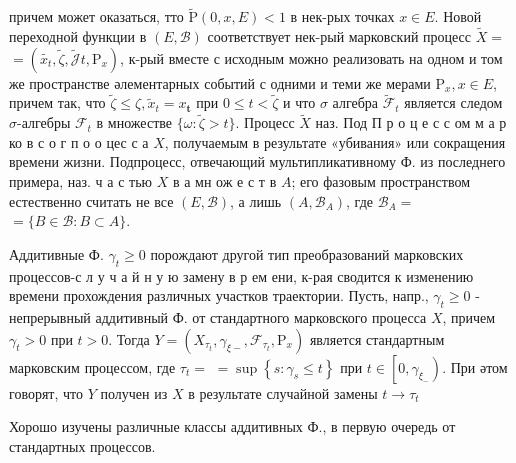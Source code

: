 \documentclass[10pt]{article}
\begin{document}
причем может оказаться, тто $\tilde{\mathrm{P}}(0, x, E)<1$ в нек-рых точках $x \in E$. Новой переходной функции в $(E, \mathscr{B})$ соответствует нек-рый марковский процесс $\tilde{X}=$ $=\left(\tilde{x_{t}}, \tilde{\zeta}, \tilde{\mathscr{J}} t, \mathrm{P}_{x}\right)$, к-рый вместе с исходным можно реализовать на одном и том же пространстве әлементарных событий с одними и теми же мерами $\mathrm{P}_{x}, x \in E$, причем так, что $\tilde{\zeta} \leqslant \zeta, \tilde{x}_{t}=x_{\boldsymbol{t}}$ при $0 \leqslant t<\tilde{\zeta}$ и что $\sigma$ алгебра $\tilde{\mathscr{F}}_{t}$ является следом $\sigma$-алгебры $\mathscr{F}_{t}$ в множестве $\{\omega: \tilde{\zeta}>t\}$. Процесс $\tilde{X}$ наз. Под П р о ц е с с ом м а р ко в с о г п о о цес с а $X$, получаемым в результате «убивания» или сокращения времени жизни. Подпроцесс, отвечающий мультипликативному Ф. из последнего примера, наз. ч а с тью $X$ в а мн ож е с т в $A$; его фазовым пространством естественно считать не все $(E, \mathscr{B})$, а лишь $\left(A, \mathscr{B}_{A}\right)$, где $\mathscr{B}_{A}=$ $=\{B \in \mathscr{B}: B \subset A\}$.



Аддитивные Ф. $\gamma_{t} \geqslant 0$ порождают другой тип преобразований марковских процессов-с л у ч а й н у ю замену в р ем ени, к-рая сводится к изменению времени прохождения различных участков траектории. Пусть, напр., $\gamma_{t} \geqslant 0$ - непрерывный аддитивный Ф. от стандартного марковского процесса $X$, причем $\gamma_{t}>0$ при $t>0$. Тогда $Y=\left(X_{\tau_{t}}, \gamma_{\xi-}, \mathscr{F}_{\tau_{t}}, \mathrm{P}_{x}\right)$ является стандартным марковским процессом, где $\tau_{t}=$ $=\sup \left\{s: \gamma_{s} \leqslant t\right\}$ при $t \in\left[0, \gamma_{\xi_{-}}\right)$. При әтом говорят, что $Y$ получен из $X$ в результате случайной замены $t \longrightarrow \tau_{t}$



Хорошо изучены различные классы аддитивных Ф., в первую очередь от стандартных процессов.
\end{document}
